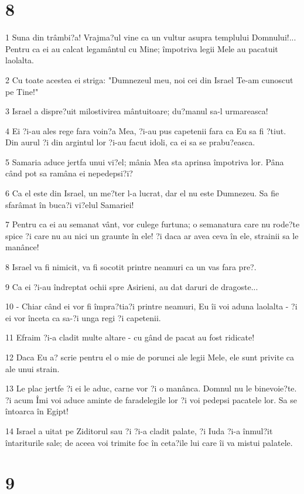\chapter{8}

\par 1 Suna din trâmbi?a! Vrajma?ul vine ca un vultur asupra templului Domnului!... Pentru ca ei au calcat legamântul cu Mine; împotriva legii Mele au pacatuit laolalta.
\par 2 Cu toate acestea ei striga: "Dumnezeul meu, noi cei din Israel Te-am cunoscut pe Tine!"
\par 3 Israel a dispre?uit milostivirea mântuitoare; du?manul sa-l urmareasca!
\par 4 Ei ?i-au ales rege fara voin?a Mea, ?i-au pus capetenii fara ca Eu sa fi ?tiut. Din aurul ?i din argintul lor ?i-au facut idoli, ca ei sa se prabu?easca.
\par 5 Samaria aduce jertfa unui vi?el; mânia Mea sta aprinsa împotriva lor. Pâna când pot sa ramâna ei nepedepsi?i?
\par 6 Ca el este din Israel, un me?ter l-a lucrat, dar el nu este Dumnezeu. Sa fie sfarâmat în buca?i vi?elul Samariei!
\par 7 Pentru ca ei au semanat vânt, vor culege furtuna; o semanatura care nu rode?te spice ?i care nu au nici un graunte în ele! ?i daca ar avea ceva în ele, strainii sa le manânce!
\par 8 Israel va fi nimicit, va fi socotit printre neamuri ca un vas fara pre?.
\par 9 Ca ei ?i-au îndreptat ochii spre Asirieni, au dat daruri de dragoste...
\par 10 - Chiar când ei vor fi împra?tia?i printre neamuri, Eu îi voi aduna laolalta - ?i ei vor înceta ca sa-?i unga regi ?i capetenii.
\par 11 Efraim ?i-a cladit multe altare - cu gând de pacat au fost ridicate!
\par 12 Daca Eu a? scrie pentru el o mie de porunci ale legii Mele, ele sunt privite ca ale unui strain.
\par 13 Le plac jertfe ?i ei le aduc, carne vor ?i o manânca. Domnul nu le binevoie?te. ?i acum Îmi voi aduce aminte de faradelegile lor ?i voi pedepsi pacatele lor. Sa se întoarca în Egipt!
\par 14 Israel a uitat pe Ziditorul sau ?i ?i-a cladit palate, ?i Iuda ?i-a înmul?it întariturile sale; de aceea voi trimite foc în ceta?ile lui care îi va mistui palatele.

\chapter{9}

